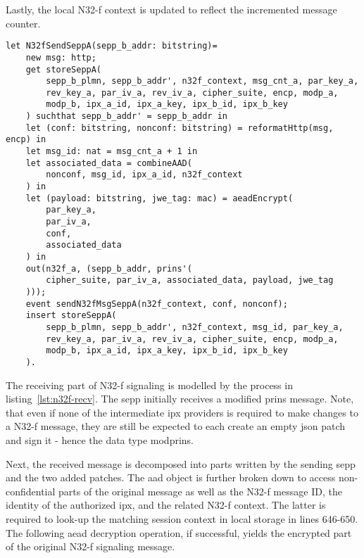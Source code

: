 Lastly, the local N32-f context is updated to reflect the incremented message counter.

\begin{lstlisting}[caption={Definition of the sending N32-f signaling transmission process},label={lst:n32f-send},firstnumber=595]
let N32fSendSeppA(sepp_b_addr: bitstring)=
    new msg: http;
    get storeSeppA(
        sepp_b_plmn, sepp_b_addr', n32f_context, msg_cnt_a, par_key_a,
        rev_key_a, par_iv_a, rev_iv_a, cipher_suite, encp, modp_a,
        modp_b, ipx_a_id, ipx_a_key, ipx_b_id, ipx_b_key
    ) suchthat sepp_b_addr' = sepp_b_addr in
    let (conf: bitstring, nonconf: bitstring) = reformatHttp(msg, encp) in
    let msg_id: nat = msg_cnt_a + 1 in
    let associated_data = combineAAD(
        nonconf, msg_id, ipx_a_id, n32f_context
    ) in
    let (payload: bitstring, jwe_tag: mac) = aeadEncrypt(
        par_key_a,
        par_iv_a,
        conf,
        associated_data
    ) in
    out(n32f_a, (sepp_b_addr, prins'(
        cipher_suite, par_iv_a, associated_data, payload, jwe_tag
    )));
    event sendN32fMsgSeppA(n32f_context, conf, nonconf);
    insert storeSeppA(
        sepp_b_plmn, sepp_b_addr', n32f_context, msg_id, par_key_a,
        rev_key_a, par_iv_a, rev_iv_a, cipher_suite, encp, modp_a,
        modp_b, ipx_a_id, ipx_a_key, ipx_b_id, ipx_b_key
    ).
\end{lstlisting}

The receiving part of N32-f signaling is modelled by the process in listing~\ref{lst:n32f-recv}.
The \gls{sepp} initially receives a modified \gls{prins} message.
Note, that even if none of the intermediate \gls{ipx} providers is required to make changes to a N32-f message, they are still be expected to each create an empty \gls{json} patch and sign it - hence the data type {\sffamily modprins}.

Next, the received message is decomposed into parts written by the sending \gls{sepp} and the two added patches.
The \gls{aad} object is further broken down to access non-confidential parts of the original message as well as the N32-f message ID, the identity of the authorized \gls{ipx}, and the related N32-f context.
The latter is required to look-up the matching session context in local storage in lines 646-650.
The following \gls{aead} decryption operation, if successful, yields the encrypted part of the original N32-f signaling message.


